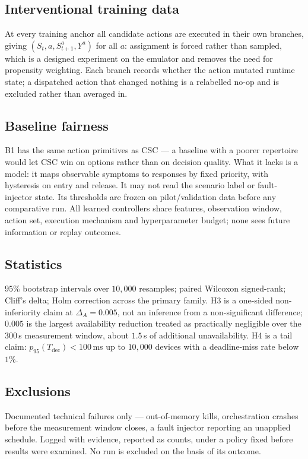 \documentclass[journal]{IEEEtran}
\begin{document}
\subsection{Interventional training data} At every training anchor all candidate
actions are executed in their own branches, giving $(S_t,a,S^a_{t+1},Y^a)$ for
all $a$: assignment is forced rather than sampled, which is a designed
experiment on the emulator and removes the need for propensity weighting. Each
branch records whether the action mutated runtime state; a dispatched action
that changed nothing is a relabelled no-op and is excluded rather than averaged
in.

\subsection{Baseline fairness} B1 has the same action primitives as CSC --- a
baseline with a poorer repertoire would let CSC win on options rather than on
decision quality. What it lacks is a model: it maps observable symptoms to
responses by fixed priority, with hysteresis on entry and release. It may not
read the scenario label or fault-injector state. Its thresholds are frozen on
pilot/validation data before any comparative run. All learned controllers share
features, observation window, action set, execution mechanism and hyperparameter
budget; none sees future information or replay outcomes.

\subsection{Statistics} $95\%$ bootstrap intervals over $10{,}000$ resamples;
paired Wilcoxon signed-rank; Cliff's delta; Holm correction across the primary
family. H3 is a one-sided non-inferiority claim at $\Delta_A=0.005$, not an
inference from a non-significant difference; $0.005$ is the largest availability
reduction treated as practically negligible over the $300$\,s measurement window,
about $1.5$\,s of additional unavailability. H4 is a tail claim:
$p_{95}(T_{\mathrm{dec}})<100$\,ms up to $10{,}000$ devices with a deadline-miss
rate below $1\%$.

\subsection{Exclusions} Documented technical failures only --- out-of-memory
kills, orchestration crashes before the measurement window closes, a fault
injector reporting an unapplied schedule. Logged with evidence, reported as
counts, under a policy fixed before results were examined. No run is excluded on
the basis of its outcome.
\end{document}
